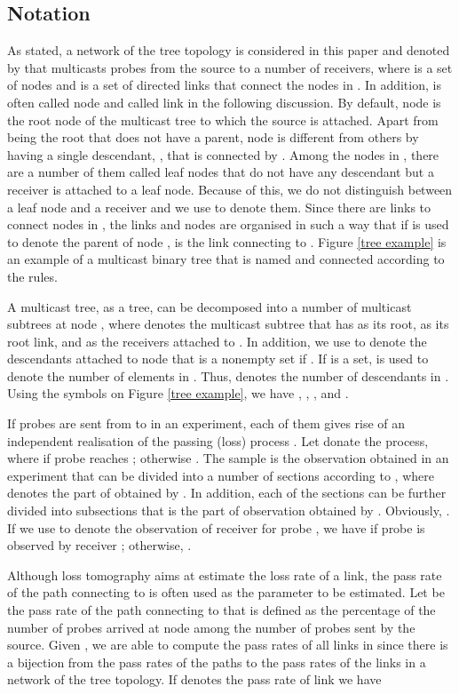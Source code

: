 \documentclass[10pt,onecolumn]{IEEEtran}
\begin{document}
\subsection{Notation}\label{treenotation}

As stated, a network of the tree topology is considered in this paper and denoted 
by  that multicasts probes from the source to a number of receivers, where   is a set of
nodes and  is a set of directed links that connect the
nodes in . In addition,  is often called node  and  called link  in the following discussion. By default,  node  is the root node of the multicast tree to which the source is attached. Apart from being the root that does not have a parent, node  is different from  others by having a single descendant, , that is connected by .  Among the nodes in , there are a number of them called leaf nodes that do not have any descendant but a receiver is attached to a leaf node. Because of this, we do not distinguish between a leaf node and a receiver and we use  to denote them. Since there are  links to connect   nodes in , the links and nodes are organised in such a way that if  is used to denote
the parent of node ,   is the link connecting  to
.  Figure \ref{tree example} is an example of a multicast binary tree that is named and connected according to the rules.

A multicast tree, as a tree, can be decomposed into a number of
 multicast subtrees at node , where  denotes the multicast subtree that has  as its root,  as its root link,  and  as the receivers attached to .  In addition, we use   to denote the descendants attached to node  that is a nonempty set if . If  is a set,  is used to denote the number of elements in . Thus,  denotes the number of descendants in  . Using the symbols on Figure \ref{tree example}, we have ,  ,  ,  and .

 If  probes are sent from  to  in an experiment,
each of them gives rise of an independent realisation
of the passing (loss) process . Let  donate the  process, where  if probe 
reaches ; otherwise . The sample
 is  the observation obtained in an experiment that can be divided into a number of sections according to , where  denotes the part of  obtained by . In addition, each of the sections can be further divided into subsections  that is the part of observation obtained by . Obviously, .
If we use  to denote the observation of receiver  for probe , we have  if probe  is observed by receiver ; otherwise, .

 Although loss tomography aims at estimate the loss rate of a link,  the pass rate of the path connecting  to  is often used as the parameter  to be estimated. Let  be the pass rate of the path connecting  to  that is defined as the percentage of the number of probes arrived at node  among the number of probes sent by the source.  Given , we are able to compute the pass rates of all links in  since there is a bijection from the pass rates of the paths to the pass rates of the links in a network of the tree topology.  If  denotes the pass rate of link  we have
 
\end{document}

